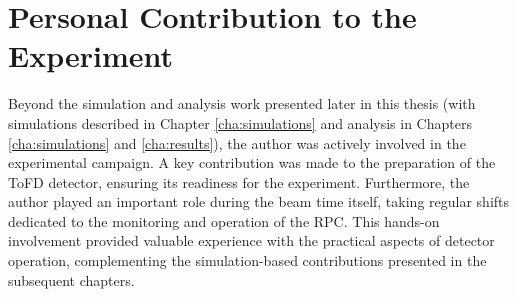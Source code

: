 \section{Personal Contribution to the Experiment}

Beyond the simulation and analysis work presented later in this thesis (with simulations described in Chapter \ref{cha:simulations} and analysis in Chapters \ref{cha:simulations} and \ref{cha:results}), the author was actively involved in the experimental campaign. A key contribution was made to the preparation of the \gls{ToFD} detector, ensuring its readiness for the experiment. Furthermore, the author played an important role during the beam time itself, taking regular shifts dedicated to the monitoring and operation of the \gls{RPC}. This hands-on involvement provided valuable experience with the practical aspects of detector operation, complementing the simulation-based contributions presented in the subsequent chapters.
